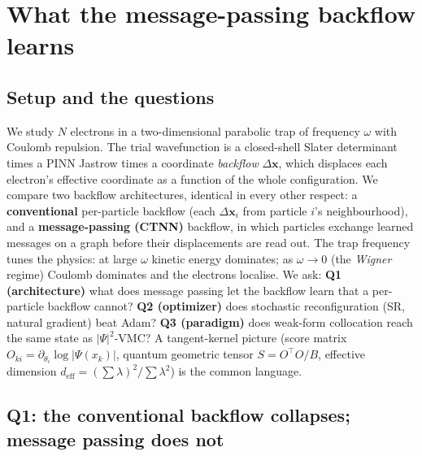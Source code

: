 %

\chapter{What the message-passing backflow learns}
\label{ch:backflow}

\section{Setup and the questions}

We study $N$ electrons in a two-dimensional parabolic trap of frequency
$\omega$ with Coulomb repulsion. The trial wavefunction is a closed-shell
Slater determinant times a PINN Jastrow times a coordinate \emph{backflow}
$\Delta\mathbf{x}$, which displaces each electron's effective coordinate as a
function of the whole configuration. We compare two backflow architectures,
identical in every other respect: a \textbf{conventional} per-particle backflow
(each $\Delta\mathbf{x}_i$ from particle $i$'s neighbourhood), and a
\textbf{message-passing (CTNN)} backflow, in which particles exchange learned
messages on a graph before their displacements are read out. The trap frequency
tunes the physics: at large $\omega$ kinetic energy dominates; as
$\omega\!\to\!0$ (the \emph{Wigner} regime) Coulomb dominates and the electrons
localise. We ask: \textbf{Q1 (architecture)} what does message passing let the
backflow learn that a per-particle backflow cannot? \textbf{Q2 (optimizer)} does
stochastic reconfiguration (SR, natural gradient) beat Adam? \textbf{Q3
(paradigm)} does weak-form collocation reach the same state as $|\Psi|^2$-VMC?
A tangent-kernel picture (score matrix $O_{ki}=\partial_{\theta_i}\log|\Psi(x_k)|$,
quantum geometric tensor $S=O^\top O/B$, effective dimension
$d_{\mathrm{eff}}=(\sum\lambda)^2/\sum\lambda^2$) is the common language.

\section{Q1: the conventional backflow collapses; message passing does not}
\label{sec:q1}

